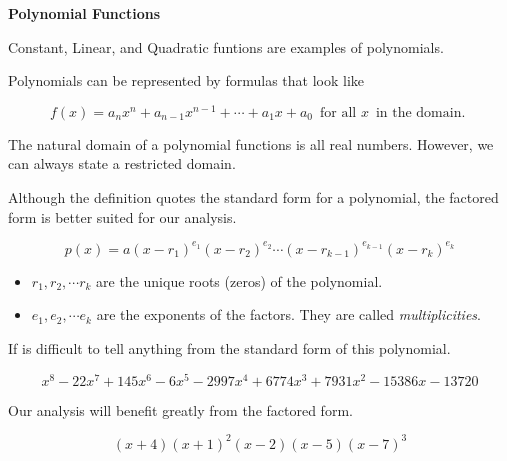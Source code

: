 \documentclass{ximera}
\begin{document}
\begin{template}  \textbf{\textcolor{blue!55!black}{Polynomial Functions}} 



Constant, Linear, and Quadratic funtions are examples of polynomials. 


Polynomials can be represented by formulas that look like


\[ f(x) = a_n x^n + a_{n-1} x^{n-1} + \cdots + a_1 x + a_0  \,  \text{ for all } x  \, \text{ in the domain. }   \]



\end{template}




The natural domain of a polynomial functions is all real numbers.  However, we can always state a restricted domain.




Although the definition quotes the standard form for a polynomial, the factored form is better suited for our analysis.

\[
p(x) = a (x - r_1)^{e_1} (x - r_2)^{e_2} \cdots (x - r_{k-1})^{e_{k-1}} (x - r_k)^{e_k}  
\]


\begin{itemize}
\item $r_1, r_2, \cdots r_k$ are the unique roots (zeros) of the polynomial.
\item $e_1, e_2, \cdots e_k$ are the exponents of the factors. They are called \textit{multiplicities}.
\end{itemize}



\begin{example}

If is difficult to tell anything from the standard form of this polynomial.

\[
x^8 - 22 x^7 +145 x^6 - 6 x^5 - 2997 x^4 + 6774 x^3 + 7931 x^2 - 15386 x - 13720
\]



Our analysis will benefit greatly from the factored form.


\[
(x+4) (x+1)^2 (x-2) (x-5) (x-7)^3
\]




\end{example}
\end{document}

